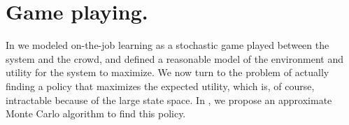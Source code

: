 \section{Game playing.}
\label{sec:game-playing}

In  we modeled on-the-job learning as a stochastic game played between the system and the crowd, and defined a reasonable model of the environment and utility for the system to maximize.
We now turn to the problem of actually finding a policy that maximizes the expected utility,
which is, of course, intractable because of the large state space.
In , we propose an approximate Monte Carlo algorithm to find this policy. 




